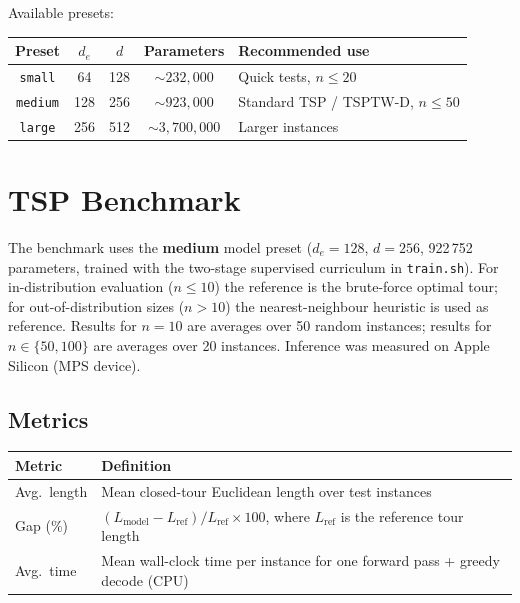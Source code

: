 \documentclass[12pt,a4paper]{article}
\begin{document}
Available presets:

\begin{center}
\begin{tabularx}{\linewidth}{ccccX}
\toprule
\textbf{Preset} & $d_e$ & $d$ & \textbf{Parameters} & \textbf{Recommended use} \\
\midrule
\texttt{small}  & 64  & 128 & ${\sim}232{,}000$   & Quick tests, $n \leq 20$ \\
\texttt{medium} & 128 & 256 & ${\sim}923{,}000$   & Standard TSP / TSPTW-D, $n \leq 50$ \\
\texttt{large}  & 256 & 512 & ${\sim}3{,}700{,}000$ & Larger instances \\
\bottomrule
\end{tabularx}
\end{center}

\section{TSP Benchmark}

The benchmark uses the \textbf{medium} model preset
($d_e = 128$, $d = 256$, 922\,752 parameters, trained with the two-stage
supervised curriculum in \texttt{train.sh}).
For in-distribution evaluation ($n \leq 10$) the reference is the brute-force
optimal tour; for out-of-distribution sizes ($n > 10$) the nearest-neighbour
heuristic is used as reference.
Results for $n = 10$ are averages over 50 random instances;
results for $n \in \{50, 100\}$ are averages over 20 instances.
Inference was measured on Apple Silicon (MPS device).

\subsection*{Metrics}

\begin{center}
\begin{tabularx}{\linewidth}{lX}
\toprule
\textbf{Metric} & \textbf{Definition} \\
\midrule
Avg.\ length & Mean closed-tour Euclidean length over test instances \\
Gap (\%)     & $(L_{\mathrm{model}} - L_{\mathrm{ref}}) / L_{\mathrm{ref}} \times 100$, where $L_{\mathrm{ref}}$ is the reference tour length \\
Avg.\ time   & Mean wall-clock time per instance for one forward pass + greedy decode (CPU) \\
\bottomrule
\end{tabularx}
\end{center}
\end{document}
